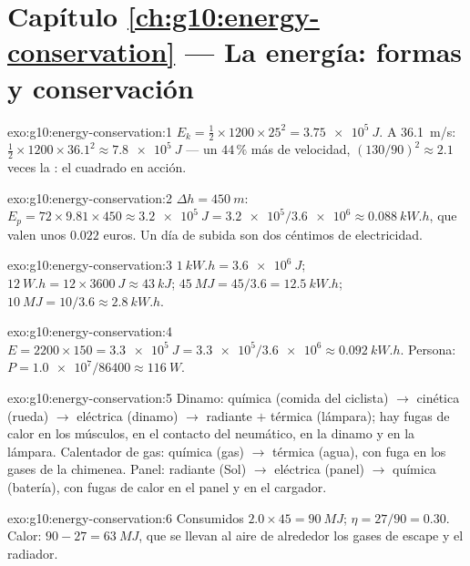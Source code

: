 \section*{Capítulo \ref{ch:g10:energy-conservation} --- La energía: formas y conservación}

\begin{solution}{exo:g10:energy-conservation:1}
$E_k = \tfrac12 \times 1200 \times 25^2 = \qty{3.75e5}{J}$. A
\qty{36.1}{m/s}:
$\tfrac12 \times 1200 \times 36.1^2 \approx \qty{7.8e5}{J}$ --- un
$44\,\%$ más de velocidad, $(130/90)^2 \approx 2.1$ veces la : el cuadrado en acción.
\end{solution}

\begin{solution}{exo:g10:energy-conservation:2}
$\Delta h = \qty{450}{m}$:
$E_p = 72 \times 9.81 \times 450 \approx \qty{3.2e5}{J}
= \num{3.2e5}/\num{3.6e6} \approx \qty{0.088}{kW.h}$, que valen unos
$0.022$ euros. Un día de subida son dos céntimos de electricidad.
\end{solution}

\begin{solution}{exo:g10:energy-conservation:3}
$\qty{1}{kW.h} = \qty{3.6e6}{J}$;
$\qty{12}{W.h} = 12 \times \qty{3600}{J} \approx \qty{43}{kJ}$;
$\qty{45}{MJ} = 45/3.6 = \qty{12.5}{kW.h}$;
$\qty{10}{MJ} = 10/3.6 \approx \qty{2.8}{kW.h}$.
\end{solution}

\begin{solution}{exo:g10:energy-conservation:4}
$E = 2200 \times 150 = \qty{3.3e5}{J}
= \num{3.3e5}/\num{3.6e6} \approx \qty{0.092}{kW.h}$. Persona:
$P = \num{1.0e7}/\num{86400} \approx \qty{116}{W}$.
\end{solution}

\begin{solution}{exo:g10:energy-conservation:5}
Dinamo: química (comida del ciclista) $\to$ cinética (rueda) $\to$
eléctrica (dinamo) $\to$ radiante $+$ térmica (lámpara); hay fugas de
calor en los músculos, en el contacto del neumático, en la dinamo y en
la lámpara. Calentador de gas: química (gas) $\to$ térmica (agua), con
fuga en los gases de la chimenea. Panel: radiante (Sol) $\to$ eléctrica
(panel) $\to$ química (batería), con fugas de calor en el panel y en el
cargador.
\end{solution}

\begin{solution}{exo:g10:energy-conservation:6}
Consumidos $2.0 \times 45 = \qty{90}{MJ}$; $\eta = 27/90 = 0.30$.
Calor: $90 - 27 = \qty{63}{MJ}$, que se llevan al aire de alrededor los
gases de escape y el radiador.
\end{solution}

